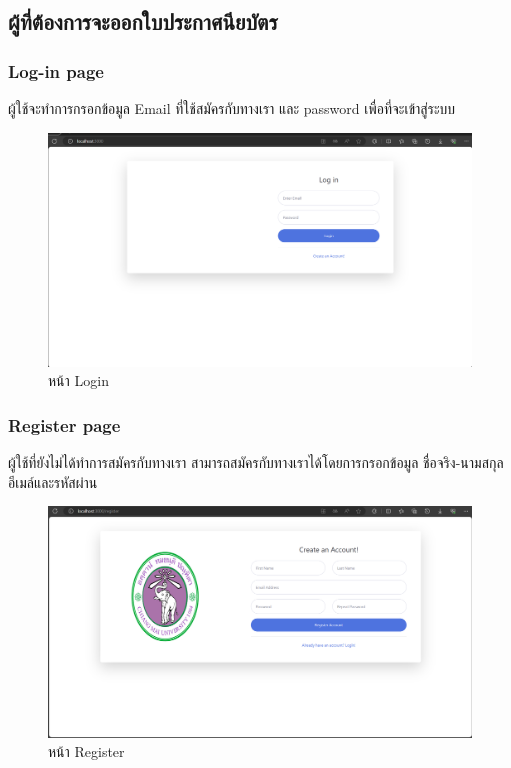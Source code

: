 \subsection{ผู้ที่ต้องการจะออกใบประกาศนียบัตร}

\subsubsection{Log-in page} 
\enskip \enskip \enskip \enskip \enskip
ผู้ใช้จะทำการกรอกข้อมูล Email ที่ใช้สมัครกับทางเรา และ password เพื่อที่จะเข้าสู่ระบบ
\graphicspath{ {./images/} }
\begin{figure}[htbp]
  \centering 
  \includegraphics[scale=0.3]{login.png}
  \caption[หน้า Login]{หน้า Login}
  \label{fig:login}
\end{figure}

\subsubsection{Register page} 
\enskip \enskip \enskip \enskip \enskip
ผู้ใช้ที่ยังไม่ได้ทำการสมัครกับทางเรา สามารถสมัครกับทางเราได้โดยการกรอกข้อมูล ชื่อจริง-นามสกุลอีเมล์และรหัสผ่าน
\graphicspath{ {./images/} }
\begin{figure}[htbp]
  \centering 
  \includegraphics[scale=0.3]{register.png}
  \caption[หน้า Register]{หน้า Register}
  \label{fig:Register}
\end{figure}
\\\\\\
